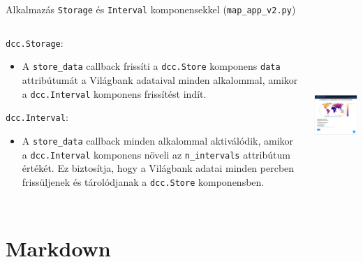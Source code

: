 \documentclass[english, aspectratio=169]{beamer}
\makeatletter
\let\origtableofcontents=\tableofcontents
\def\tableofcontents{\@ifnextchar[{\origtableofcontents}{\gobbletableofcontents}}
\def\gobbletableofcontents#1{\origtableofcontents}
\makeatother
\begin{document}
\begin{frame}{Alkalmazás \texttt{Storage} és \texttt{Interval} komponensekkel (\texttt{map\_app\_v2.py})}
	\begin{columns}
		\begin{column}{.6\textwidth}
			\texttt{dcc.Storage}:
			\begin{itemize}
				\item A \texttt{store\_data} callback frissíti a \texttt{dcc.Store} komponens \texttt{data} attribútumát a Világbank adataival minden alkalommal, amikor a \texttt{dcc.Interval} komponens frissítést indít.
			\end{itemize}
			\texttt{dcc.Interval}:
			\begin{itemize}
				\item A \texttt{store\_data} callback minden alkalommal aktiválódik, amikor a \texttt{dcc.Interval} komponens növeli az \texttt{n\_intervals} attribútum értékét. Ez biztosítja, hogy a Világbank adatai minden percben frissüljenek és tárolódjanak a \texttt{dcc.Store} komponensben.
			\end{itemize}
		\end{column}
		\begin{column}{.4\textwidth}
			\begin{center}
				\includegraphics[width=6cm, height=6cm, keepaspectratio]{images/scatter_24.png}
			\end{center}
		\end{column}
	\end{columns}
\end{frame}

\section{Markdown}

\begin{frame}{}
	\tableofcontents[currentsection]
\end{frame}
\end{document}
